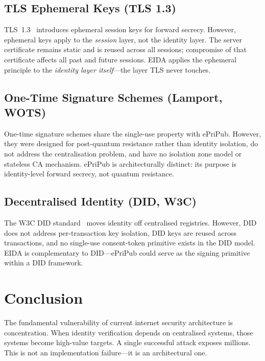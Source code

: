 \documentclass[11pt,a4paper]{article}
\begin{document}
\subsection{TLS Ephemeral Keys (TLS 1.3)}

TLS~1.3~\cite{RFC8446} introduces ephemeral session keys for forward
secrecy.  However, ephemeral keys apply to the \emph{session} layer, not the
identity layer.  The server certificate remains static and is reused across
all sessions; compromise of that certificate affects all past and future
sessions.  EIDA applies the ephemeral principle to the \emph{identity layer
itself}---the layer TLS never touches.

\subsection{One-Time Signature Schemes (Lamport, WOTS)}

One-time signature schemes share the single-use property with ePriPub.
However, they were designed for post-quantum resistance rather than identity
isolation, do not address the centralisation problem, and have no isolation
zone model or stateless CA mechanism.  ePriPub is architecturally distinct:
its purpose is identity-level forward secrecy, not quantum resistance.

\subsection{Decentralised Identity (DID, W3C)}

The W3C DID standard~\cite{W3CDID} moves identity off centralised registries.
However, DID does not address per-transaction key isolation, DID keys are
reused across transactions, and no single-use consent-token primitive exists
in the DID model.  EIDA is complementary to DID---ePriPub could serve as the
signing primitive within a DID framework.

\section{Conclusion}

The fundamental vulnerability of current internet security architecture is
concentration.  When identity verification depends on centralised systems,
those systems become high-value targets.  A single successful attack exposes
millions.  This is not an implementation failure---it is an architectural one.
\end{document}
